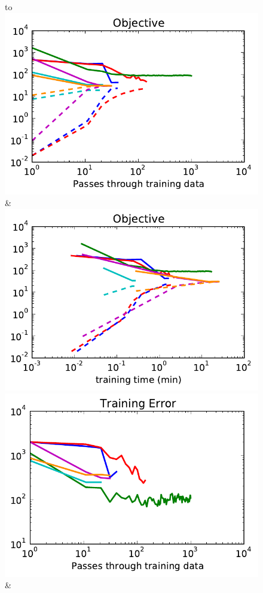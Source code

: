 \begin{figure}
    \begin{tabu} to 
    \\[-3mm]
    \includegraphics[width=\linewidth]{evaluation/images/snakes_qpbo}&%
    \includegraphics[width=\linewidth]{evaluation/images/snakes_qpbo_time}\\
    \includegraphics[width=\linewidth]{evaluation/images/snakes_qpbo_loss}&%

\end{tabu}
\end{figure}
